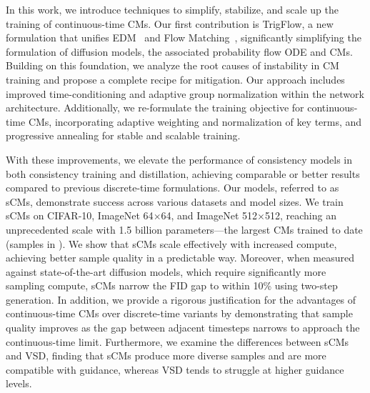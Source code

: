 In this work, we introduce techniques to simplify, stabilize, and scale up the training of continuous-time CMs. Our first contribution is TrigFlow, a new formulation that unifies EDM~\citep{karras2022edm,karras2024edm2} and Flow Matching~\citep{peluchetti2022nondenoising,lipman2022flowmatching,rectified_flow,albergo2023stochastic_interpolants,heitz2023iterative}, significantly simplifying the formulation of diffusion models, the associated probability flow ODE and CMs. Building on this foundation, we analyze the root causes of instability in CM training and propose a complete recipe for mitigation. Our approach includes improved time-conditioning and adaptive group normalization within the network architecture. Additionally, we re-formulate the training objective for continuous-time CMs, incorporating adaptive weighting and normalization of key terms, and progressive annealing for stable and scalable training. 

With these improvements, we elevate the performance of consistency models in both consistency training and distillation, achieving comparable or better results compared to previous discrete-time formulations. Our models, referred to as sCMs, demonstrate success across various datasets and model sizes. We train sCMs on CIFAR-10, ImageNet 64$\times$64, and ImageNet 512$\times$512, reaching an unprecedented scale with 1.5 billion parameters---the largest CMs trained to date (samples in ). We show that sCMs scale effectively with increased compute, achieving better sample quality in a predictable way. Moreover, when measured against state-of-the-art diffusion models, which require significantly more sampling compute, sCMs narrow the FID gap to within 10\% using two-step generation. In addition, we provide a rigorous justification for the advantages of continuous-time CMs over discrete-time variants by demonstrating that sample quality improves as the gap between adjacent timesteps narrows to approach the continuous-time limit. Furthermore, we examine the differences between sCMs and VSD, finding that sCMs produce more diverse samples and are more compatible with guidance, whereas VSD tends to struggle at higher guidance levels.

